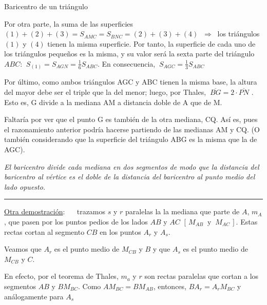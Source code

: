 \begin{myexampleblock}{Baricentro de un triángulo}
\begin{small}
\vspace{2mm} Por otra parte, la suma de las superficies $(1)+(2)+(3)=S_{AMC}=S_{BNC}=(2)+(3)+(4)$ $\ \Rightarrow \ $ los triángulos $(1)$ y $(4)$ tienen la misma superficie. Por tanto, la superficie de cada uno de los triángulos pequeños es la misma, y su valor será la sexta parte del triángulo $ABC$: $\ S_{(1)}=S_{AGN}=\frac 1 6 S_{ABC}$. En consecuencia, $\ S_{AGC}=\frac 1 3 S_{ABC}$

\vspace{2mm} Por último, como ambos triángulos AGC y ABC tienen la misma base, la altura del mayor debe ser el triple que la del menor; luego, por Thales, $\  \overline{BG} = 2\cdot \overline{PN}$ . Esto es, G divide a la mediana AM a distancia doble de A que de M.

\vspace{2mm} Faltaría por ver que el punto G es también de la otra mediana, CQ. Así es, pues el razonamiento anterior podría hacerse partiendo de las medianas AM y CQ. (O también considerando que la superficie del triángulo ABG es la misma que la de AGC). \QED

\vspace{5mm} \emph{\textsf{El baricentro divide cada mediana en dos segmentos de modo que la distancia del baricentro al vértice es el doble de la distancia del baricentro al punto medio del lado opuesto.}}

\begin{center}\rule{250pt}{0.1pt}\end{center}

\vspace{2mm} 
\underline{Otra demostración}: $\quad$ trazamos $s$ y $r$ paralelas la la mediana que parte de $A$, $m_A$, que pasen por los puntos pedios de los lados $AB$ y $AC$ $[\, M_{AB} \ \text { y } \ M_{AC} \, ]$. Estas rectas cortan al segmento $CB$ en los puntos $A_r$ y $A_s$.

\begin{multicols}{2}
Veamos que $A_r$ es el punto medio de $M_{CB}$ y $B$ y que $A_s$ es el punto medio de $M_{CB}$ y $C$. 

\vspace{1mm}En efecto, por el teorema de Thales, $m_a$ y $r$ son rectas paralelas que cortan a los segmentos $AB$ y $BM_{BC}$. Como $AM_{BC}=BM_{AB}$, entonces, $BA_r=A_rM_{BC}$ y análogamente para $A_s$


\end{multicols}
\end{small}
\end{myexampleblock}
